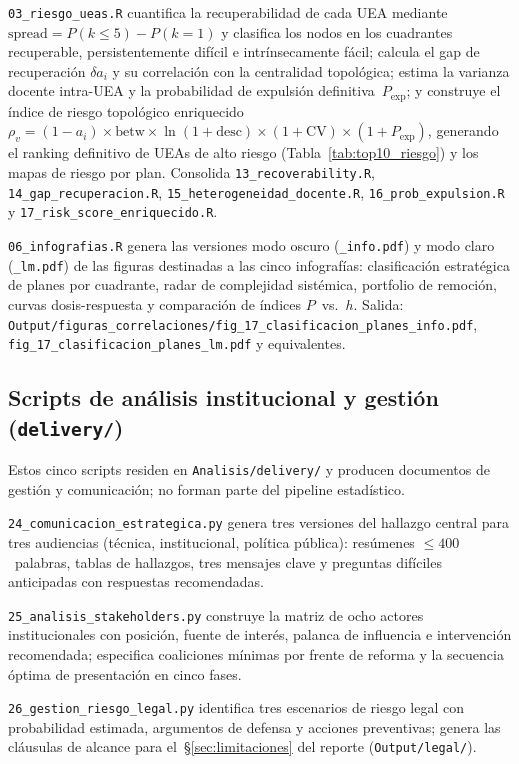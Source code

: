 \documentclass[11pt,letterpaper]{article}
\begin{document}
\begin{sloppypar}
\texttt{03\_riesgo\_ueas.R}
cuantifica la recuperabilidad de cada UEA mediante
$\mathrm{spread}=P(k\leq 5)-P(k=1)$ y clasifica los nodos en los cuadrantes
recuperable, persistentemente difícil e intrínsecamente fácil; calcula el
gap de recuperación $\delta a_i$ y su correlación con la centralidad
topológica; estima la varianza docente intra-UEA y la probabilidad de
expulsión definitiva~$P_{\mathrm{exp}}$; y construye el índice de riesgo
topológico enriquecido
$\rho_v=(1-a_i)\times\mathrm{betw}\times\ln(1+\mathrm{desc})
\times(1+\mathrm{CV})\times(1+P_{\mathrm{exp}})$,
generando el ranking definitivo de UEAs de alto riesgo
(Tabla~\ref{tab:top10_riesgo}) y los mapas de riesgo por plan.
Consolida \texttt{13\_recoverability.R}, \texttt{14\_gap\_recuperacion.R},
\texttt{15\_heterogeneidad\_docente.R}, \texttt{16\_prob\_expulsion.R}
y \texttt{17\_risk\_score\_enriquecido.R}.

\texttt{06\_infografias.R}
genera las versiones modo oscuro (\texttt{\_info.pdf}) y modo claro
(\texttt{\_lm.pdf}) de las figuras destinadas a las cinco infografías:
clasificación estratégica de planes por cuadrante, radar de complejidad
sistémica, portfolio de remoción, curvas dosis-respuesta y comparación
de índices $P$~vs.~$h$.
Salida: \texttt{Output/figuras\_correlaciones/fig\_17\_clasificacion\_planes\_info.pdf},
        \texttt{fig\_17\_clasificacion\_planes\_lm.pdf} y equivalentes.

\subsection{Scripts de análisis institucional y gestión (\texttt{delivery/})}

Estos cinco scripts residen en \texttt{Analisis/delivery/} y producen
documentos de gestión y comunicación; no forman parte del pipeline
estadístico.

\texttt{24\_comunicacion\_estrategica.py}
genera tres versiones del hallazgo central para tres audiencias (técnica,
institucional, política pública): resúmenes $\leq 400$~palabras, tablas de
hallazgos, tres mensajes clave y preguntas difíciles anticipadas con
respuestas recomendadas.

\texttt{25\_analisis\_stakeholders.py}
construye la matriz de ocho actores institucionales con posición, fuente de
interés, palanca de influencia e intervención recomendada; especifica coaliciones
mínimas por frente de reforma y la secuencia óptima de presentación en cinco fases.

\texttt{26\_gestion\_riesgo\_legal.py}
identifica tres escenarios de riesgo legal con probabilidad estimada, argumentos
de defensa y acciones preventivas; genera las cláusulas de alcance para
el~\S\ref{sec:limitaciones} del reporte (\texttt{Output/legal/}).


\end{sloppypar}
\end{document}
